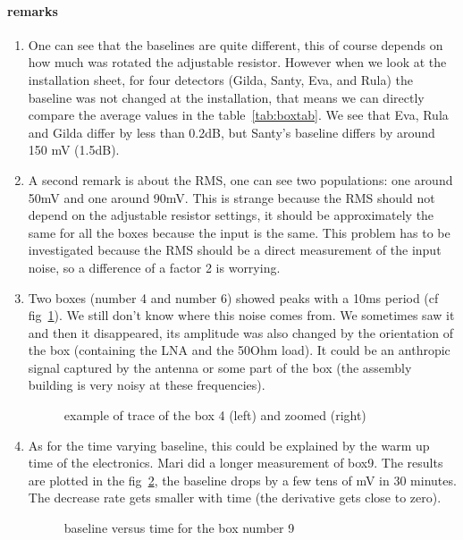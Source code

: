 \paragraph{remarks}
\begin{enumerate}
\item  One can see  that the  baselines are  quite different,  this of
  course   depends   on   how   much  was   rotated   the   adjustable
  resistor. However when  we look at the installation  sheet, for four
  detectors (Gilda, Santy, Eva, and Rula) the baseline was not changed
  at the installation, that means  we can directly compare the average
  values  in the table~\ref{tab:boxtab}.   We see  that Eva,  Rula and
  Gilda differ  by less  than 0.2dB, but  Santy's baseline  differs by
  around 150 mV (1.5dB).
\item A second  remark is about the RMS, one  can see two populations:
  one around 50mV and one around 90mV. This is strange because the RMS
  should not depend on the  adjustable resistor settings, it should be
  approximately the  same for all the  boxes because the  input is the
  same. This problem has to  be investigated because the RMS should be
  a direct measurement of the input noise, so a difference of a factor
  2 is worrying.
\item  Two boxes  (number 4  and number  6) showed  peaks with  a 10ms
  period  (cf fig~\ref{fig:peaks}).   We still  don't know  where this
  noise comes from.  We sometimes  saw it and then it disappeared, its
  amplitude was also changed by the orientation of the box (containing
  the  LNA  and the  50Ohm  load). It  could  be  an anthropic  signal
  captured  by the  antenna  or some  part  of the  box (the  assembly
  building is very noisy at these frequencies).
  \begin{figure}[!ht]
    \centering
    \hspace*{-3ex}
    \caption{example of trace of the box 4 (left) and zoomed (right)}
    \label{fig:peaks}
  \end{figure}
\item As for the time varying baseline, this could be explained by the
  warm up time  of the electronics.  Mari did  a longer measurement of
  box9.  The results are  plotted in the fig~\ref{fig:box9vstime}, the
  baseline drops by a few tens of mV in 30 minutes.  The decrease rate
  gets smaller with time (the derivative gets close to zero).
  \begin{figure}[!ht]
    \centering
    \hspace*{-3ex}
    \caption{baseline versus time for the box number 9}
    \label{fig:box9vstime}
  \end{figure}
\end{enumerate}

